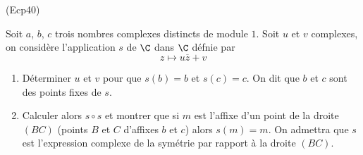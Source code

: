 \begin{tiny}(Ecp40)\end{tiny} \label{Ecp40} Soit $a$, $b$, $c$ trois nombres complexes distincts de module $1$.\newline
Soit $u$ et $v$ complexes, on considère l'application $s$ de $\C$ dans $\C$ défnie par
\begin{displaymath}
  z\mapsto u \overline{z} +v
\end{displaymath}
\begin{enumerate}
  \item Déterminer $u$ et $v$ pour que $s(b)=b$ et $s(c)=c$. On dit que $b$ et $c$ sont des points fixes de $s$. 
  \item Calculer alors $s\circ s$ et montrer que si $m$ est l'affixe d'un point de la droite $(BC)$  (points $B$ et $C$ d'affixes $b$ et $c$) alors $s(m)=m$.\newline
  On admettra que $s$ est l'expression complexe de la symétrie par rapport à la droite $(BC)$.
\end{enumerate}

